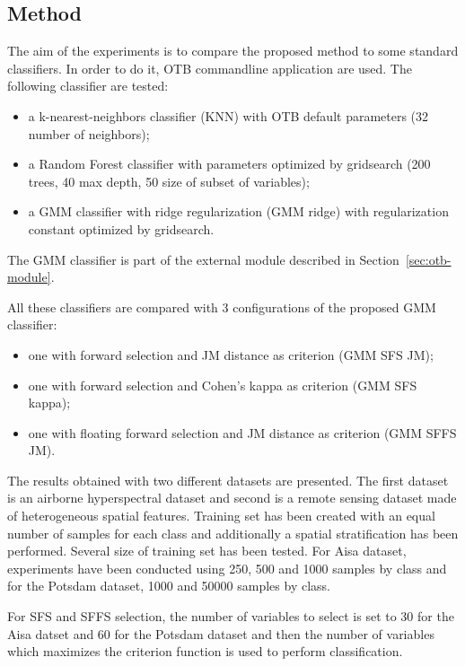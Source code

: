\documentclass[journal,peerreview,onecolumn]{IEEEtran}
\begin{document}
    \subsection{Method}
    \label{sec:method}

    The aim of the experiments is to compare the proposed method to some standard classifiers. In order to do it, OTB commandline application are used. The following classifier are tested:
    \begin{itemize}
        \item a k-nearest-neighbors classifier (KNN) with OTB default parameters (32 number of neighbors);
        \item a Random Forest classifier with parameters optimized by gridsearch (200 trees, 40 max depth, 50 size of subset of variables);
        \item a GMM classifier with ridge regularization (GMM ridge) with regularization constant optimized by gridsearch.
    \end{itemize}
    The GMM classifier is part of the external module described in Section~\ref{sec:otb-module}.

    All these classifiers are compared with 3 configurations of the proposed GMM classifier:
    \begin{itemize}
        \item one with forward selection and JM distance as criterion (GMM SFS JM);
        \item one with forward selection and Cohen's kappa as criterion (GMM SFS kappa);
        \item one with floating forward selection and JM distance as criterion (GMM SFFS JM).
    \end{itemize}

    The results obtained with two different datasets are presented. The first dataset is an airborne hyperspectral dataset and second is a remote sensing dataset made of heterogeneous spatial features. Training set has been created with an equal number of samples for each class and additionally a spatial stratification has been performed. Several size of training set has been tested. For Aisa dataset, experiments have been conducted using 250, 500 and 1000 samples by class and for the Potsdam dataset, 1000 and 50000 samples by class.

    For SFS and SFFS selection, the number of variables to select is set to 30 for the Aisa datset and 60 for the Potsdam dataset and then the number of variables which maximizes the criterion function is used to perform classification.
\end{document}
